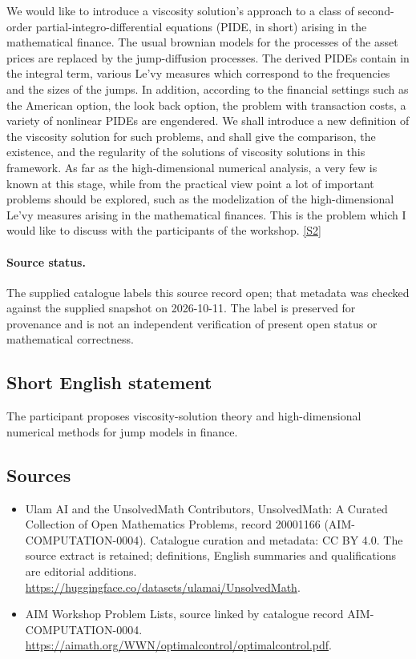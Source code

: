 \documentclass[11pt]{article}
\newcommand{\sref}[2]{\hyperlink{source:#1:#2}{[S#2]}}
\begin{document}
We would like to introduce a viscosity solution's approach to a class of second-order partial-integro-differential equations (PIDE, in short) arising in the mathematical finance. The usual brownian models for the processes of the asset prices are replaced by the jump-diffusion processes. The derived PIDEs contain in the integral term, various Le'vy measures which correspond to the frequencies and the sizes of the jumps. In addition, according to the financial settings such as the American option, the look back option, the problem with transaction costs, a variety of nonlinear PIDEs are engendered. We shall introduce a new definition of the viscosity solution for such problems, and shall give the comparison, the existence, and the regularity of the solutions of viscosity solutions in this framework. As far as the high-dimensional numerical analysis, a very few is known at this stage, while from the practical view point a lot of important problems should be explored, such as the modelization of the high-dimensional Le'vy measures arising in the mathematical finances. This is the problem which I would like to discuss with the participants of the workshop. \sref{20001166}{2}
\paragraph{Source status.}
The supplied catalogue labels this source record open; that metadata was checked against the supplied snapshot on 2026-10-11. The label is preserved for provenance and is not an independent verification of present open status or mathematical correctness.
\subsection{Short English statement}
The participant proposes viscosity-solution theory and high-dimensional numerical methods for jump models in finance.
\subsection{Sources}
\begin{itemize}
\item[\hypertarget{source:20001166:1}{S1}] Ulam AI and the UnsolvedMath Contributors, UnsolvedMath: A Curated Collection of Open Mathematics Problems, record 20001166 (AIM-COMPUTATION-0004). Catalogue curation and metadata: CC BY 4.0. The source extract is retained; definitions, English summaries and qualifications are editorial additions.
\url{https://huggingface.co/datasets/ulamai/UnsolvedMath}.
\item[\hypertarget{source:20001166:2}{S2}] AIM Workshop Problem Lists, source linked by catalogue record AIM-COMPUTATION-0004.
\url{https://aimath.org/WWN/optimalcontrol/optimalcontrol.pdf}.
\end{itemize}
\end{document}

